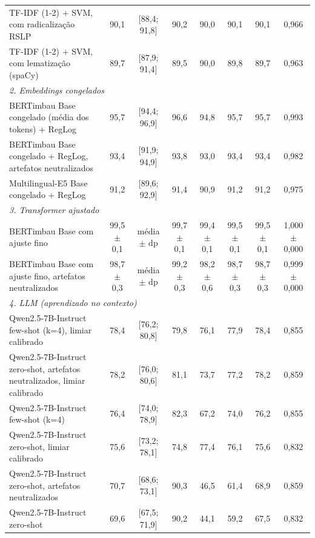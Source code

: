 \begin{table}[t]
\begin{tabular}{lccccccc}
TF-IDF (1-2) + SVM, com radicalização RSLP & 90,1 & [88,4; 91,8] & 90,2 & 90,0 & 90,1 & 90,1 & 0,966 \\
TF-IDF (1-2) + SVM, com lematização (spaCy) & 89,7 & [87,9; 91,4] & 89,5 & 90,0 & 89,8 & 89,7 & 0,963 \\
\multicolumn{8}{l}{\textit{2. Embeddings congelados}} \\
BERTimbau Base congelado (média dos tokens) + RegLog & 95,7 & [94,4; 96,9] & 96,6 & 94,8 & 95,7 & 95,7 & 0,993 \\
BERTimbau Base congelado + RegLog, artefatos neutralizados & 93,4 & [91,9; 94,9] & 93,8 & 93,0 & 93,4 & 93,4 & 0,982 \\
Multilingual-E5 Base congelado + RegLog & 91,2 & [89,6; 92,9] & 91,4 & 90,9 & 91,2 & 91,2 & 0,975 \\
\multicolumn{8}{l}{\textit{3. Transformer ajustado}} \\
BERTimbau Base com ajuste fino & 99,5 $\pm$ 0,1 & média $\pm$ dp & 99,7 $\pm$ 0,1 & 99,4 $\pm$ 0,1 & 99,5 $\pm$ 0,1 & 99,5 $\pm$ 0,1 & 1,000 $\pm$ 0,000 \\
BERTimbau Base com ajuste fino, artefatos neutralizados & 98,7 $\pm$ 0,3 & média $\pm$ dp & 99,2 $\pm$ 0,3 & 98,2 $\pm$ 0,6 & 98,7 $\pm$ 0,3 & 98,7 $\pm$ 0,3 & 0,999 $\pm$ 0,000 \\
\multicolumn{8}{l}{\textit{4. LLM (aprendizado no contexto)}} \\
Qwen2.5-7B-Instruct few-shot (k=4), limiar calibrado & 78,4 & [76,2; 80,8] & 79,8 & 76,1 & 77,9 & 78,4 & 0,855 \\
Qwen2.5-7B-Instruct zero-shot, artefatos neutralizados, limiar calibrado & 78,2 & [76,0; 80,6] & 81,1 & 73,7 & 77,2 & 78,2 & 0,859 \\
Qwen2.5-7B-Instruct few-shot (k=4) & 76,4 & [74,0; 78,9] & 82,3 & 67,2 & 74,0 & 76,2 & 0,855 \\
Qwen2.5-7B-Instruct zero-shot, limiar calibrado & 75,6 & [73,2; 78,1] & 74,8 & 77,4 & 76,1 & 75,6 & 0,832 \\
Qwen2.5-7B-Instruct zero-shot, artefatos neutralizados & 70,7 & [68,6; 73,1] & 90,3 & 46,5 & 61,4 & 68,9 & 0,859 \\
Qwen2.5-7B-Instruct zero-shot & 69,6 & [67,5; 71,9] & 90,2 & 44,1 & 59,2 & 67,5 & 0,832 \\
\bottomrule
\end{tabular}
\end{table}

